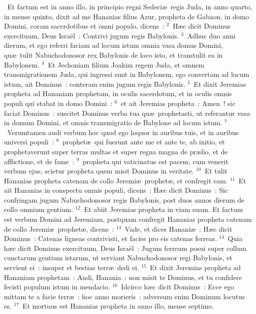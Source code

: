 ~\lettrine[lines=10,image=true,loversize=0.05,lraise=-0.03]{E}{}t factum est in anno illo, in principio regni Sedeci\ae\ regis Juda, in anno quarto, in mense quinto, dixit ad me Hananias filius Azur, propheta de Gabaon, in domo Domini, coram sacerdotibus et omni populo, dicens~:
${}^{2}$~H\ae c dicit Dominus exercituum, Deus Isra\"el~: Contrivi jugum regis Babylonis.
${}^{3}$~Adhuc duo anni dierum, et ego referri faciam ad locum istum omnia vasa domus Domini, qu\ae\ tulit Nabuchodonosor rex Babylonis de loco isto, et transtulit ea in Babylonem.
${}^{4}$~Et Jechoniam filium Joakim regem Juda, et omnem transmigrationem Juda, qui ingressi sunt in Babylonem, ego convertam ad locum istum, ait Dominus~: conteram enim jugum regis Babylonis.
${}^{5}$~Et dixit Jeremias propheta ad Hananiam prophetam, in oculis sacerdotum, et in oculis omnis populi qui stabat in domo Domini~:
${}^{6}$~et ait Jeremias propheta~: Amen~! sic faciat Dominus~: suscitet Dominus verba tua qu\ae\ prophetasti, ut referantur vasa in domum Domini, et omnis transmigratio de Babylone ad locum istum.
${}^{7}$~Verumtamen audi verbum hoc quod ego loquor in auribus tuis, et in auribus universi populi~:
${}^{8}$~prophet\ae\ qui fuerunt ante me et ante te, ab initio, et prophetaverunt super terras multas et super regna magna de pr\ae lio, et de afflictione, et de fame~:
${}^{9}$~propheta qui vaticinatus est pacem, cum venerit verbum ejus, scietur propheta quem misit Dominus in veritate.
${}^{10}$~Et tulit Hananias propheta catenam de collo Jeremi\ae\ prophet\ae , et confregit eam.
${}^{11}$~Et ait Hananias in conspectu omnis populi, dicens~: H\ae c dicit Dominus~: Sic confringam jugum Nabuchodonosor regis Babylonis, post duos annos dierum de collo omnium gentium.
${}^{12}$~Et abiit Jeremias propheta in viam suam. Et factum est verbum Domini ad Jeremiam, postquam confregit Hananias propheta catenam de collo Jeremi\ae\ prophet\ae , dicens~:
${}^{13}$~Vade, et dices Hanani\ae~: H\ae c dicit Dominus~: Catenas ligneas contrivisti, et facies pro eis catenas ferreas.
${}^{14}$~Quia h\ae c dicit Dominus exercituum, Deus Isra\"el~: Jugum ferreum posui super collum cunctarum gentium istarum, ut serviant Nabuchodonosor regi Babylonis, et servient ei~: insuper et bestias terr\ae\ dedi ei.
${}^{15}$~Et dixit Jeremias propheta ad Hananiam prophetam~: Audi, Hanania~: non misit te Dominus, et tu confidere fecisti populum istum in mendacio.
${}^{16}$~Idcirco h\ae c dicit Dominus~: Ecce ego mittam te a facie terr\ae~: hoc anno morieris~: adversum enim Dominum locutus es.
${}^{17}$~Et mortuus est Hananias propheta in anno illo, mense septimo.
